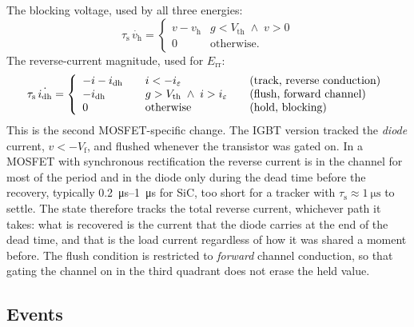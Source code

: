 \documentclass[11pt,a4paper]{article}
\newcommand{\Err}{E_{\mathrm{rr}}}
\newcommand{\idh}{i_{\mathrm{dh}}}
\newcommand{\vh}{v_{\mathrm{h}}}
\newcommand{\taus}{\tau_{\mathrm{s}}}
\begin{document}
The blocking voltage, used by all three energies:
\begin{equation}
\taus\,\dot{\vh} =
\begin{cases}
 v - \vh & g < V_\mathrm{th} \;\wedge\; v > 0 \\
 0       & \text{otherwise}.
\end{cases}
\label{eq:vh}
\end{equation}
The reverse-current magnitude, used for $\Err$:
\begin{equation}
\taus\,\dot{\idh} =
\left\{\begin{array}{l@{\qquad}l@{\qquad}l}
 -i - \idh & i < -i_\varepsilon & \text{(track, reverse conduction)} \\
 -\idh     & g > V_\mathrm{th} \;\wedge\; i > i_\varepsilon & \text{(flush, forward channel)} \\
 0         & \text{otherwise} & \text{(hold, blocking)}
\end{array}\right.
\label{eq:idh}
\end{equation}
This is the second MOSFET-specific change. The IGBT version tracked the
\emph{diode} current, $v<-V_\mathrm{f}$, and flushed whenever the transistor
was gated on. In a MOSFET with synchronous rectification the reverse current
is in the channel for most of the period and in the diode only during the dead
time before the recovery, typically \SIrange{0.2}{1}{\micro\second} for SiC,
too short for a tracker with $\taus\approx\SI{1}{\micro\second}$ to settle.
The state therefore tracks the total reverse current, whichever path it takes:
what is recovered is the current that the diode carries at the end of the dead
time, and that is the load current regardless of how it was shared a moment
before. The flush condition is restricted to \emph{forward} channel
conduction, so that gating the channel on in the third quadrant does not
erase the held value.

\subsection{Events}
\end{document}
